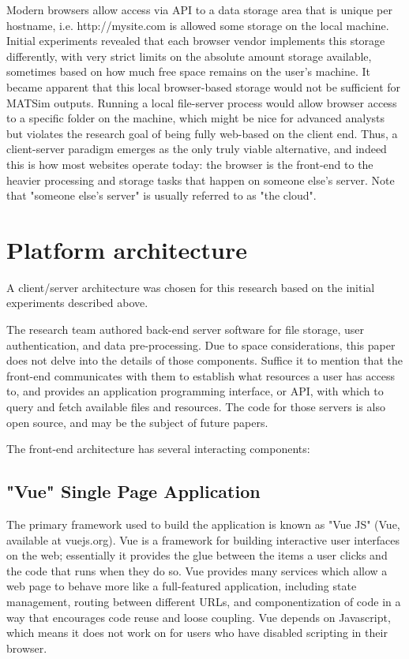 \documentclass[Afour,sagev,times]{sagej}
\begin{document}
Modern browsers allow access via API to a data storage area that is unique per hostname, i.e. http://mysite.com is allowed some storage on the local machine. Initial experiments revealed that each browser vendor implements this storage differently, with very strict limits on the absolute amount storage available, sometimes based on how much free space remains on the user's machine. It became apparent that this local browser-based storage would not be sufficient for MATSim outputs. Running a local file-server process would allow browser access to a specific folder on the machine, which might be nice for advanced analysts but violates the research goal of being fully web-based on the client end. Thus, a client-server paradigm emerges as the only truly viable alternative, and indeed this is how most websites operate today: the browser is the front-end to the heavier processing and storage tasks that happen on someone else's server. Note that "someone else's server" is usually referred to as "the cloud".

\section{Platform architecture}

A client/server architecture was chosen for this research based on the initial experiments described above.

The research team authored back-end server software for file storage, user authentication, and data pre-processing. Due to space considerations, this paper does not delve into the details of those components. Suffice it to mention that the front-end communicates with them to establish what resources a user has access to, and provides an application programming interface, or API, with which to query and fetch available files and resources. The code for those servers is also open source, and may be the subject of future papers.

The front-end architecture has several interacting components:

\subsection{"Vue" Single Page Application}

The primary framework used to build the application is known as "Vue JS" (Vue, available at vuejs.org). Vue is a framework for building interactive user interfaces on the web; essentially it provides the glue between the items a user clicks and the code that runs when they do so. Vue provides many services which allow a web page to behave more like a full-featured application, including state management, routing between different URLs, and componentization of code in a way that encourages code reuse and loose coupling. Vue depends on Javascript, which means it does not work on for users who have disabled scripting in their browser.
\end{document}
